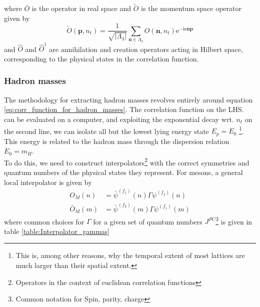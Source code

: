\documentclass[a4paper,10pt]{article}
\begin{document}
where $\bar{O}$ is the operator in real space and $\widetilde{O}$ is the momentum space operator given by
\begin{equation}
\widetilde{O}\left(\boldsymbol{p}, n_{t}\right)=\frac{1}{\sqrt{\left|\Lambda_{3}\right|}} \sum_{\boldsymbol{n} \in \Lambda_{3}} O\left(\boldsymbol{n}, n_{t}\right) \mathrm{e}^{-\mathrm{i} a \boldsymbol{n} \boldsymbol{p}}
\end{equation}
and $\widehat{O}$ and $\widehat{O}^{\dagger}$ are annihilation and creation operators acting in Hilbert space, corresponding to the physical states in the correlation function.
\subsubsection{Hadron masses}\label{hadron_masses}
The methodology for extracting hadron masses revolves entirely around equation \eqref{eq:corr_function_for_hadron_masses}. The correlation function on the LHS. can be evaluated on a computer, and exploiting the exponential decay wrt. $n_t$ on the second line, we can isolate all but the lowest lying energy state $E_p=E_0$ \footnote{This is, among other reasons, why the temporal extent of most lattices are much larger than their spatial extent.}. This energy is related to the hadron mass through the dispersion relation $E_0 = m_H$.\\ To do this, we need to construct interpolators\footnote{Operators in the context of euclidean correlation functions} with the correct symmetries and quantum numbers of the physical states they represent. For mesons, a general local interpolator is given by
\begin{equation}
\begin{aligned} 
O_{M}(n)&=\bar{\psi}^{\left(f_{1}\right)}(n) \Gamma \psi^{\left(f_{2}\right)}(n)\\ \bar{O}_{M}(m)&=\bar{\psi}^{\left(f_{2}\right)}(m) \Gamma \psi^{\left(f_{1}\right)}(m)
\end{aligned}
\end{equation}
where common choices for $\Gamma$ for a given set of quantum numbers $J^{P C}$\footnote{Common notation for Spin, parity, charge} is given in table \ref{table:Interpolator_gammas}
\end{document}
